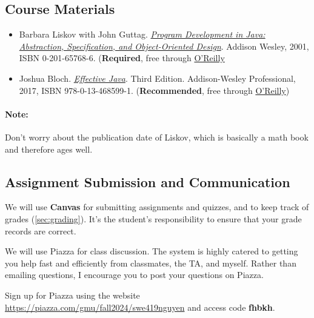 \documentclass[11pt]{article}
\begin{document}
\subsection{Course Materials}
\begin{itemize}
  \item Barbara Liskov with John Guttag. \href{https://www.amazon.com/Program-Development-Java-Specification-Object-Oriented/dp/0201657686/ref=sr_1_2?dchild=1&qid=1626231221&refinements=p_27\%3ABarbara+Liskov&s=books&sr=1-2&text=Barbara+Liskov}{\emph{Program
  Development in Java: Abstraction, Specification, and Object-Oriented  Design}}. Addison Wesley, 2001, ISBN 0-201-65768-6.  (\textbf{Required}, free through \href{https://learning-oreilly-com.mutex.gmu.edu/library/view/program-development-in/9780768685299/ch1.html}{ O'Reilly}


\item Joshua Bloch.
\href{https://www.amazon.com/Effective-Java-Joshua-Bloch/dp/0134685997/ref=sr_1_1?dchild=1&keywords=effective+java&qid=1626231154&sr=8-1}{\emph{Effective
  Java}}. Third Edition. Addison-Wesley Professional, 2017, ISBN
  978-0-13-468599-1. (\textbf{Recommended}, free through
        \href{https://learning-oreilly-com.mutex.gmu.edu/library/view/effective-java-3rd/9780134686097/cover.xhtml}{O'Reilly})

\end{itemize}

\paragraph{Note:} Don't worry about the publication date of Liskov, which is basically a math book and therefore ages well.

\subsection{Assignment Submission and Communication}
We will use \textbf{Canvas} for submitting assignments and quizzes, and to keep track of grades (\autoref{sec:grading}). 
It's the student's responsibility to
ensure that your grade records are correct.

We will use Piazza for class discussion. The system is highly catered to getting you help fast and efficiently from classmates, the TA, and myself. Rather than emailing questions, I encourage you to post your questions on Piazza. 

Sign up for Piazza using the website \url{https://piazza.com/gmu/fall2024/swe419nguyen} and access code \textbf{fhbkh}.
\end{document}
